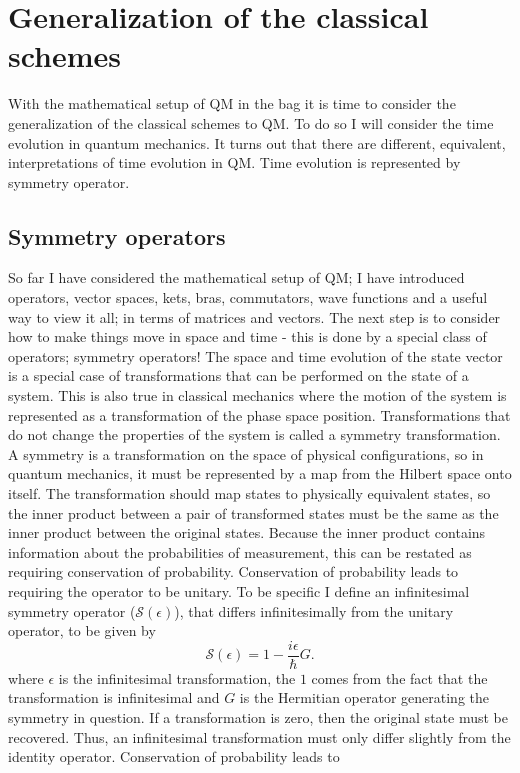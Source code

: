 \chapter{Generalization of the classical schemes}
\label{chp:4}
With the mathematical setup of QM in the bag it is time to consider the generalization of the classical schemes to QM. To do so I will consider the time evolution in quantum mechanics. It turns out that there are different, equivalent, interpretations of time evolution in QM. Time evolution is represented by symmetry operator.

\section{Symmetry operators}
So far I have considered the mathematical setup of QM; I have introduced operators, vector spaces, kets, bras, commutators, wave functions and a useful way to view it all; in terms of matrices and vectors. The next step is to consider how to make things move in space and time - this is done by a special class of operators; symmetry operators!\newline
The space and time evolution of the state vector is a special case of transformations that can be performed on the state of a system. This is also true in classical mechanics where the motion of the system is represented as a transformation of the phase space position. Transformations that do not change the properties of the system is called a symmetry transformation. A symmetry is a transformation on the space of physical configurations, so in quantum mechanics, it must be represented by a map from the Hilbert space onto itself. The transformation should map states to physically equivalent states, so the inner product between a pair of transformed states must be the same as the inner product between
the original states. Because the inner product contains information about the probabilities of measurement, this can be restated as requiring conservation of probability. Conservation of probability leads to requiring the operator to be unitary. To be specific I define an infinitesimal symmetry operator ($\mathcal{S}(\epsilon)$), that differs infinitesimally from the unitary operator, to be given by
\begin{equation}
	\mathcal{S}(\epsilon)=1-\frac{i\epsilon}{\hbar}G.
	\label{sym}
\end{equation} 
where $\epsilon$ is the infinitesimal transformation, the $1$ comes from the fact that the transformation is infinitesimal and $G$ is the Hermitian operator generating the symmetry in question. If a transformation is zero, then the original state must be recovered. Thus, an infinitesimal transformation must only differ slightly from the identity operator. Conservation of probability leads to
